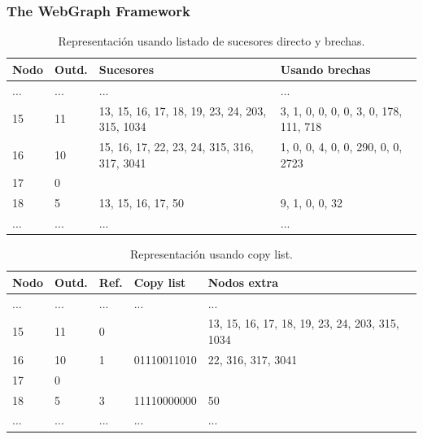 \begin{frame}
\frametitle{The WebGraph Framework}

 \begin{table}%
\caption{Representación usando listado de sucesores directo y brechas.}
\centering
\tiny

\begin{tabular}{|l|l|l|l|}
	\toprule
	Nodo & Outd. & Sucesores & Usando brechas \\
	\midrule
	... & ... & ... & ... \\
	15 & 11 & 13, 15, 16, 17, 18, 19, 23, 24, 203, 315, 1034 & 3, 1, 0, 0, 0, 0, 3, 0, 178, 111, 718 \\
	16 & 10 & 15, 16, 17, 22, 23, 24, 315, 316, 317, 3041 & 1, 0, 0, 4, 0, 0, 290, 0, 0, 2723 \\
	17 & 0 &  &  \\
	18 & 5 & 13, 15, 16, 17, 50 & 9, 1, 0, 0, 32 \\
	... & ... & ... & ... \\
\end{tabular}
\end{table} 

\begin{table}%
\caption{Representación usando copy list.}
\centering
\tiny

\begin{tabular}{|l|l|l|l|l|}
	\toprule
	Nodo & Outd. & Ref. & Copy list & Nodos extra \\
	\midrule
	... & ... & ... & ... & ... \\
	15 & 11 & 0 &  & 13, 15, 16, 17, 18, 19, 23, 24, 203, 315, 1034 \\
	16 & 10 & 1 & 01110011010 & 22, 316, 317, 3041 \\
	17 & 0 &  &  &  \\
	18 & 5 & 3 & 11110000000 & 50 \\
	... & ... & ... & ... & ... \\
\end{tabular}
\end{table} 

\end{frame}

